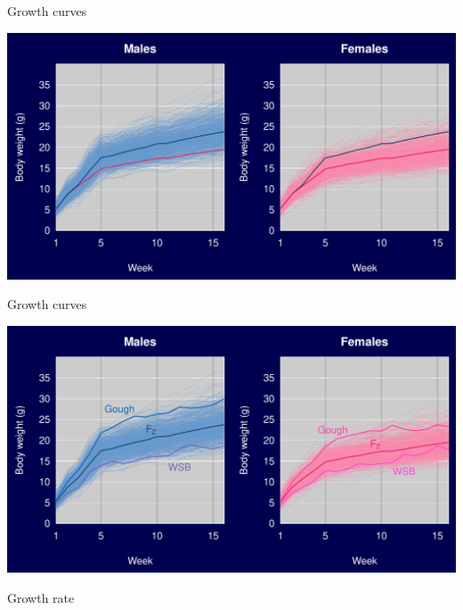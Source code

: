 \documentclass[12pt]{article}
\newcommand{\headsize}{\fontsize{35}{35} \selectfont}
\begin{document}
\newpage

\addtocounter{page}{-1}

\headsize \color{myyellow}
\hfill \begin{minipage}{5.75in}
\centering
Growth curves
\end{minipage}

\vspace{30mm}

\centerline{\includegraphics{Figs/growth2.pdf}}


\newpage

\addtocounter{page}{-1}

\headsize \color{myyellow}
\hfill \begin{minipage}{5.75in}
\centering
Growth curves
\end{minipage}

\vspace{30mm}

\centerline{\includegraphics{Figs/growth3.pdf}}


\newpage

\headsize \color{myyellow}
\hfill \begin{minipage}{5.75in}
\centering
Growth rate
\end{minipage}
\end{document}
